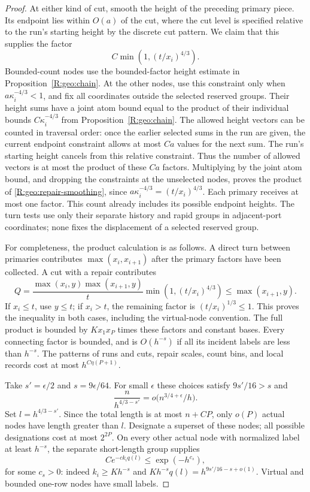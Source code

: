 \begin{proof}
At either kind of cut, smooth the height of the preceding primary
piece.  Its endpoint lies within $O(a)$ of the cut, where the cut level
is specified relative to the run's starting height by the discrete cut
pattern.  We claim that this supplies the factor
\begin{equation}\label{R:geo:repair-smoothing}
                      C\min(1,(t/x_i)^{4/3}).
\end{equation}
Bounded-count nodes use the bounded-factor height estimate in
Proposition~\ref{R:geo:chain}.  At the other nodes, use this constraint
only when $a\kappa_i^{-4/3}<1$, and fix all coordinates outside the
selected reserved groups.  Their height sums
have a joint atom bound equal to the product of their individual bounds
$C\kappa_i^{-4/3}$ from Proposition~\ref{R:geo:chain}.  The allowed
height vectors can be counted in traversal order: once the earlier
selected sums in the run are given, the current endpoint constraint
allows at most $Ca$ values for the next sum.  The run's starting height
cancels from this relative constraint.  Thus the number of allowed
vectors is at most the product of these $Ca$ factors.  Multiplying by
the joint atom bound, and dropping the constraints at the unselected
nodes, proves the product of \eqref{R:geo:repair-smoothing}, since
$a\kappa_i^{-4/3}=(t/x_i)^{4/3}$.  Each primary receives at most one
factor.  This count already includes its possible endpoint heights.
The turn tests use only their separate history and rapid groups in
adjacent-port coordinates; none fixes the displacement of a selected
reserved group.

For completeness, the product calculation is as follows.  A direct
turn between primaries contributes $\max(x_i,x_{i+1})$ after the
primary factors have been collected.  A cut with a repair contributes
\[
 Q=\frac{\max(x_i,y)\max(x_{i+1},y)}{t}
                    \min(1,(t/x_i)^{4/3})
                 \le\max(x_{i+1},y).
\]
If $x_i\le t$, use $y\le t$; if $x_i>t$, the remaining factor is
$(t/x_i)^{1/3}\le1$.  This proves the inequality in both cases,
including the virtual-node convention.  The full product is bounded
by $Kx_1x_P$ times these factors and constant bases.  Every connecting
factor is bounded, and is $O(h^{-s})$ if all its incident labels are
less than $h^{-s}$.  The patterns of runs and cuts, repair scales,
count bins, and local records cost at most
$h^{C\eta(P+1)}$.

Take $s'=\epsilon/2$ and $s=9\epsilon/64$.  For small $\epsilon$
these choices satisfy $9s'/16>s$ and
\[
 \frac{n}{h^{4/3-s'}}=o\bigl(n^{3/4+\epsilon}/h\bigr).
\]
Set $l=h^{4/3-s'}$.  Since the total length is at most $n+CP$,
only $o(P)$ actual nodes have length greater than $l$.  Designate a
superset of these nodes; all possible designations cost at most
$2^{2P}$.  On every other actual node with normalized label at least
$h^{-s}$, the separate short-length group supplies
\[
 C e^{-c k_i q(l)}\le\exp(-h^{c_s}),
\]
for some $c_s>0$: indeed $k_i\ge K h^{-s}$ and
$K h^{-s}q(l)=h^{9s'/16-s+o(1)}$.  Virtual and bounded one-row
nodes have small labels.


\end{proof}
